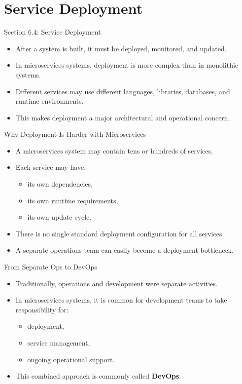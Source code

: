 \section{Service Deployment}

\begin{frame}{Section 6.4: Service Deployment}
\begin{itemize}
    \item After a system is built, it must be deployed, monitored, and updated.
    \item In microservices systems, deployment is more complex than in monolithic systems.
    \item Different services may use different languages, libraries, databases, and runtime environments.
    \item This makes deployment a major architectural and operational concern.
\end{itemize}
\end{frame}

\begin{frame}{Why Deployment Is Harder with Microservices}
\begin{itemize}
    \item A microservices system may contain tens or hundreds of services.
    \item Each service may have:
    \begin{itemize}
        \item its own dependencies,
        \item its own runtime requirements,
        \item its own update cycle.
    \end{itemize}
    \item There is no single standard deployment configuration for all services.
    \item A separate operations team can easily become a deployment bottleneck.
\end{itemize}
\end{frame}

\begin{frame}{From Separate Ops to DevOps}
\begin{itemize}
    \item Traditionally, operations and development were separate activities.
    \item In microservices systems, it is common for development teams to take responsibility for:
    \begin{itemize}
        \item deployment,
        \item service management,
        \item ongoing operational support.
    \end{itemize}
    \item This combined approach is commonly called \textbf{DevOps}.
\end{itemize}
\end{frame}

